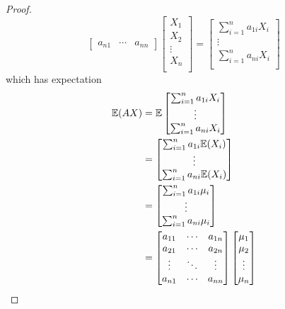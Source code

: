\documentclass[a4paper]{article}
\begin{document}
\begin{proof}[Proof]
\[\begin{bmatrix}
		a_{n1} & \cdots & a_{nn}
	\end{bmatrix}
	\begin{bmatrix}
	        X_{1} \\
		X_{2} \\
		\vdots \\
		X_{n} \\
	\end{bmatrix}
	=
	\begin{bmatrix}
		\sum_{i=1}^{n} a_{1i} X_{i} \\
		\vdots \\
		\sum_{i=1}^{n} a_{ni} X_{i} \\
	\end{bmatrix}
\]
which has expectation
\begin{align*}
	\E(AX) & =
	\E\begin{bmatrix}
		\sum_{i=1}^{n} a_{1i} X_{i} \\
		\vdots \\
		\sum_{i=1}^{n} a_{ni} X_{i} \\
	\end{bmatrix} \\
	       & =
	\begin{bmatrix}
		\sum_{i=1}^{n} a_{1i} \E(X_{i}) \\
		\vdots \\
		\sum_{i=1}^{n} a_{ni} \E(X_{i}) \\
	\end{bmatrix} \\
	       & =
	\begin{bmatrix}
		\sum_{i=1}^{n} a_{1i} \mu_{i} \\
		\vdots \\
		\sum_{i=1}^{n} a_{ni} \mu_{i} \\
	\end{bmatrix} \\
	       & =
	\begin{bmatrix}
		a_{11} & \cdots  & a_{1n} \\
		a_{21} & \cdots  & a_{2n} \\
		\vdots & \ddots & \vdots \\
		a_{n1} & \cdots & a_{nn} \\
	\end{bmatrix}
	\begin{bmatrix}
		\mu_{1} \\
		\mu_{2} \\
		\vdots \\
		\mu_{n} \\
	\end{bmatrix} \\

\end{align*}
\end{proof}
\end{document}
